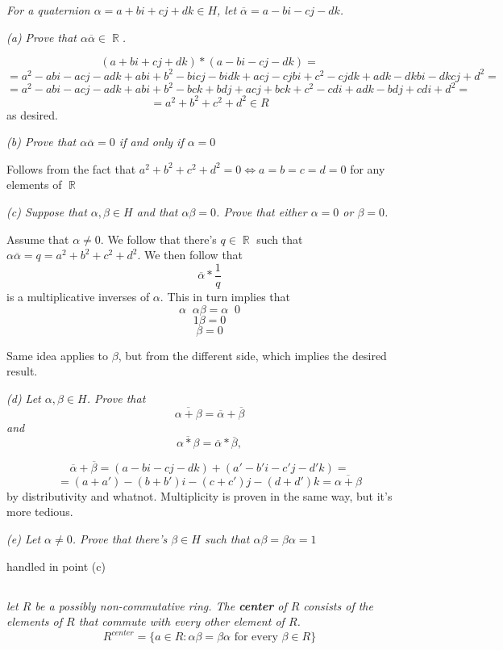 \documentclass[11pt,oneside,titlepage]{book}
\DeclareMathOperator \real {\mathbb {R}}
\DeclareMathOperator \inv {^{-1}}
\DeclareMathOperator \lra {\Leftrightarrow}
\newcommand{\set}[1]{\{ #1 \}}
\begin{document}
\textit{For a quaternion $\alpha = a + bi + cj + dk \in H$, let
  $\overline \alpha = a - bi - cj - dk$. }

\textit{(a) Prove that $\alpha \overline \alpha \in \real$.}

$$(a + bi + cj + dk) * (a - bi - cj - dk) = $$
$$ = 
a^2 - abi - acj - adk + abi + b^2 - bicj - bidk
+ acj - cjbi + c^2 - cjdk + adk - dkbi - dkcj + d^2 = $$
$$ = 
a^2 - abi - acj - adk + abi + b^2 - bck + bdj
+ acj + bck + c^2 - cdi + adk - bdj + cdi + d^2 = $$
$$ =  a^2 + b^2  + c^2 + d^2 \in R$$
as desired.

\textit{(b) Prove that $\alpha \overline \alpha = 0$ if and only if $\alpha = 0$}

Follows from the fact that $a^2 + b^2 + c^2 + d^2 = 0 \lra a = b = c =
d = 0$ for any elements of $\real$

\textit{(c) Suppose that $\alpha, \beta \in H$ and that $\alpha \beta = 0$. Prove that either
  $\alpha = 0$ or $\beta = 0$.}

Assume that $\alpha \neq 0$. We follow that there's $q \in \real$ such that
$\alpha \overline \alpha = q = a^2 + b^2 + c^2 + d^2$. We then follow that 
$$\overline{\alpha} * \frac{1}{q}$$
is a multiplicative inverses of $\alpha$. This in turn implies that
$$\alpha\inv \alpha \beta = \alpha \inv 0$$
$$1 \beta =  0$$
$$\beta =  0$$

Same idea applies to $\beta$, but from the different side, which implies the desired result.

\textit{(d) Let $\alpha, \beta \in H$. Prove that
  $$\overline{\alpha + \beta} = \overline \alpha + \overline \beta$$
  and
  $$\overline{\alpha * \beta} = \overline \alpha * \overline \beta, $$
}

$$\overline \alpha + \overline \beta = (a - bi - cj - dk) + (a' - b'i - c'j - d'k) = $$
$$= (a + a') - (b + b')i - (c + c')j - (d + d')k =  \overline{\alpha + \beta}$$
by distributivity and whatnot. Multiplicity is proven in the same way,
but it's more tedious.

\textit{(e) Let $\alpha \neq 0$. Prove that there's $\beta \in H$ such
  that $\alpha \beta = \beta \alpha = 1$}

handled in point (c)

\subsection{}

\textit{let $R$ be a possibly non-commutative ring. The
\textbf{center} of $R$ consists of the elements of $R$ that commute
with every other element of $R$.
  $$R^{center} = \set{a \in R: \alpha \beta = \beta \alpha \text{ for every } \beta \in R}$$
}
\end{document}
